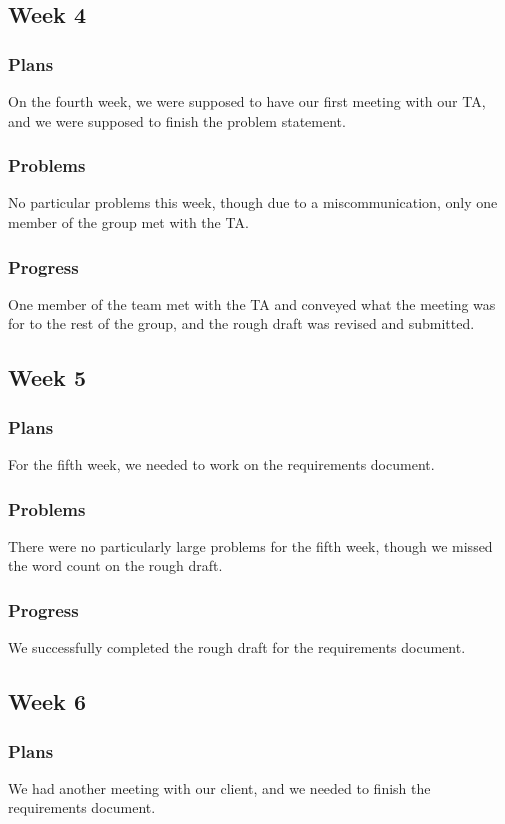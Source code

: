 \documentclass[onecolumn, draftclsnofoot, 10pt, compsoc]{IEEEtran}
\begin{document}
\subsection{Week 4}
\subsubsection{Plans}
On the fourth week, we were supposed to have our first meeting with our TA, and we were supposed to finish the problem statement.
\subsubsection{Problems}
No particular problems this week, though due to a miscommunication, only one member of the group met with the TA.
\subsubsection{Progress}
One member of the team met with the TA and conveyed what the meeting was for to the rest of the group, and the rough draft was revised and submitted. 

\subsection{Week 5}
\subsubsection{Plans}
For the fifth week, we needed to work on the requirements document.
\subsubsection{Problems}
There were no particularly large problems for the fifth week, though we missed the word count on the rough draft.
\subsubsection{Progress}
We successfully completed the rough draft for the requirements document.

\subsection{Week 6}
\subsubsection{Plans}
We had another meeting with our client, and we needed to finish the requirements document.
\end{document}
